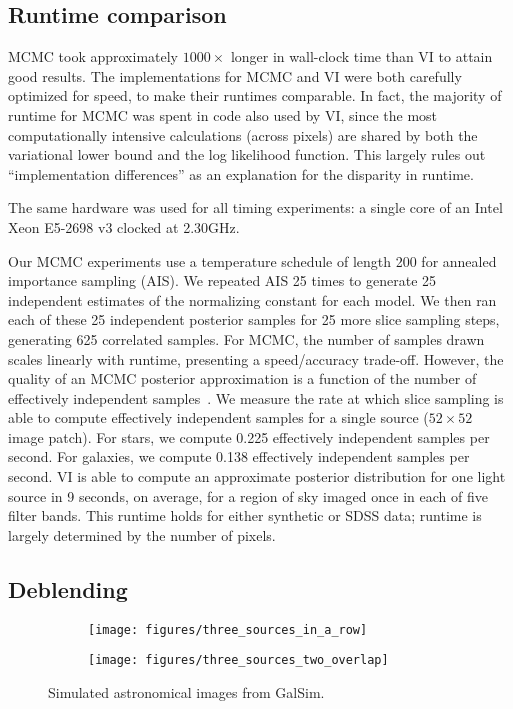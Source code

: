 \subsection{Runtime comparison}
MCMC took approximately $1000\times$ longer in wall-clock time than VI to attain good results.
The implementations for MCMC and VI were both carefully optimized for speed, to make their runtimes comparable. In fact, the majority of runtime for MCMC was spent in code also used by VI, since the most computationally intensive calculations (across pixels) are shared by both the variational lower bound and the log likelihood function. This largely rules out ``implementation differences'' as an explanation for the disparity in runtime.

The same hardware was used for all timing experiments: a single core of an Intel Xeon E5-2698 v3 clocked at 2.30GHz.

Our MCMC experiments use a temperature schedule of length 200 for annealed importance sampling (AIS).
We repeated AIS 25 times to generate 25 independent estimates of the normalizing constant for each model.
We then ran each of these 25 independent posterior samples for 25 more slice sampling steps, generating 625 correlated samples.
For MCMC, the number of samples drawn scales linearly with runtime, presenting a speed/accuracy trade-off.
However, the quality of an MCMC posterior approximation is a function of the number of effectively independent samples~\citep{gelman2014bayesian}.
We measure the rate at which slice sampling is able to compute effectively independent samples for a single source ($52\times 52$ image patch).
For stars, we compute 0.225 effectively independent samples per second.
For galaxies, we compute 0.138 effectively independent samples per second.
%
VI is able to compute an approximate posterior distribution for one light source in 9 seconds, on average, for a region of sky imaged once in each of five filter bands. This runtime holds for either synthetic or SDSS data; runtime is largely determined by the number of pixels.


\subsection{Deblending}
\begin{figure}
	\begin{subfigure}{0.45\textwidth}
		\texttt{[image: figures/three\_sources\_in\_a\_row]}
		\label{three_sources_in_a_row}
	\end{subfigure}
	\hfill
	\begin{subfigure}{0.45\textwidth}
		\texttt{[image: figures/three\_sources\_two\_overlap]}
		\label{three_sources_two_overlap}
	\end{subfigure}
	\caption{Simulated astronomical images from GalSim.}
	\label{galsim_images}
\end{figure}

